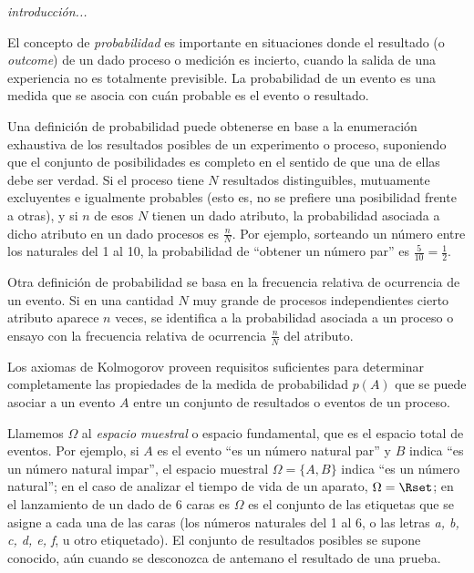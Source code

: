 \label{s:probabilidad}



\emph{introducci\'on...}

\vspace{1.5pt}

El  concepto  de  \emph{probabilidad}  es  importante en  situaciones  donde  el
resultado (o \emph{outcome})  de un dado proceso o  medici\'on es incierto, cuando
la salida de una experiencia no  es totalmente previsible. La probabilidad de un
evento es una medida que se asocia con cu\'an probable es el evento o resultado.

Una  definici\'on  de  probabilidad  puede  obtenerse en  base  a  la  enumeraci\'on
exhaustiva de los resultados posibles de un experimento o proceso,
suponiendo que el conjunto de posibilidades es completo en el sentido de que una
de  ellas debe ser  verdad. Si  el proceso  tiene $N$  resultados distinguibles,
mutuamente  excluyentes e  igualmente probables  (esto  es, no  se prefiere  una
posibilidad frente a  otras), y si $n$  de esos $N$ tienen un  dado atributo, la
probabilidad asociada  a dicho atributo en  un dado procesos es  $\frac nN$. Por
ejemplo, sorteando un n\'umero entre los naturales del 1 al 10, la probabilidad de
``obtener un n\'umero par'' es $\frac5{10} = \frac12$.

Otra definici\'on de probabilidad se  basa en la frecuencia relativa de ocurrencia
de  un evento.  Si en  una cantidad  $N$ muy  grande de  procesos independientes
cierto atributo aparece $n$ veces, se identifica a la probabilidad asociada a un
proceso  o  ensayo con  la  frecuencia relativa  de  ocurrencia  $\frac nN$  del
atributo.

Los  axiomas  de  Kolmogorov  proveen  requisitos  suficientes  para  determinar
completamente
%
las propiedades  de la medida de probabilidad  $p(A)$ que se puede  asociar a un
evento $A$ entre un conjunto de resultados o eventos de un proceso.

Llamemos $\Omega$  al \emph{espacio muestral}  o espacio fundamental, que  es el
espacio total  de eventos.  Por ejemplo, si  $A$ es  el evento ``es  un n\'umero
natural par'' y $B$ indica ``es un n\'umero natural impar'', el espacio muestral
$\Omega=\{A,B\}$ indica  ``es un n\'umero natural'';  en el caso  de analizar el
tiempo de vida de un aparato, $\Omega  = \Rset$; en el lanzamiento de un dado de
6 caras es $\Omega$ es el conjunto de  las etiquetas que se asigne a cada una de
las caras (los n\'umeros naturales del 1 al 6, o las letras \emph{a, b, c, d, e,
  f}, u otro etiquetado). El conjunto de resultados posibles se supone conocido,
a\'un cuando se desconozca de antemano el resultado de una prueba.

